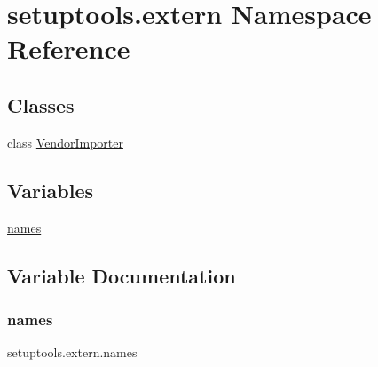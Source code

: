 \hypertarget{namespacesetuptools_1_1extern}{}\section{setuptools.\+extern Namespace Reference}
\label{namespacesetuptools_1_1extern}
\subsection*{Classes}
\begin{DoxyCompactItemize}
\item 
class \hyperlink{classsetuptools_1_1extern_1_1_vendor_importer}{Vendor\+Importer}
\end{DoxyCompactItemize}
\subsection*{Variables}
\begin{DoxyCompactItemize}
\item 
\hyperlink{namespacesetuptools_1_1extern_abd24b5ae6a41d81c24ba1e0bc4404a5b}{names}
\end{DoxyCompactItemize}


\subsection{Variable Documentation}
\mbox{\label{namespacesetuptools_1_1extern_abd24b5ae6a41d81c24ba1e0bc4404a5b}} 
\subsubsection{\texorpdfstring{names}{names}}
{\footnotesize\ttfamily setuptools.\+extern.\+names}

